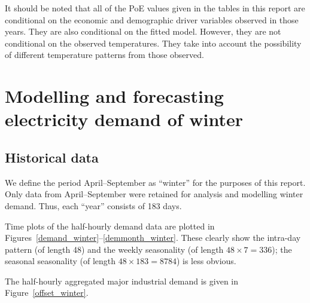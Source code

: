 \documentclass[11pt]{article}
\begin{document}

It should be noted that all of the PoE values given in the tables in this report are conditional on the economic and demographic driver variables observed in those years. They are also conditional on the fitted model. However, they are not conditional on the observed temperatures. They take into account the possibility of different temperature patterns from those observed.

\clearpage


\section{Modelling and forecasting electricity demand of winter}

\subsection{Historical data}

We define the period April--September as ``winter'' for the purposes of this report. Only data from April--September were retained for analysis and modelling winter demand. Thus, each ``year'' consists of 183 days.

Time plots of the half-hourly demand data are plotted in Figures~\ref{demand_winter}--\ref{demmonth_winter}. These clearly show the intra-day pattern (of length 48) and the weekly seasonality (of length $48\times7 = 336$); the seasonal seasonality (of length $48\times183=8784$) is less obvious.





The half-hourly aggregated major industrial demand is given in Figure~\ref{offset_winter}.


\end{document}

